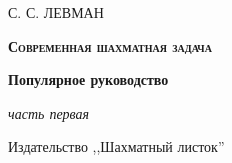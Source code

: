 \begin{titlepage}
\centering
	{\scshape\LARGE С. С. ЛЕВМАН \par}
	\vspace{2cm}
	{\scshape\bfseries\huge\color{red} Современная шахматная задача\par}
	\vspace{1.5cm}
	{\Large\bfseries Популярное руководство\par}
	\vspace{1.5cm}
	{\Large\itshape\color{red} часть первая\par}
	\vspace{1.5cm}
	\vfill

	{\large Издательство ,,Шахматный листок''\par}
\end{titlepage}